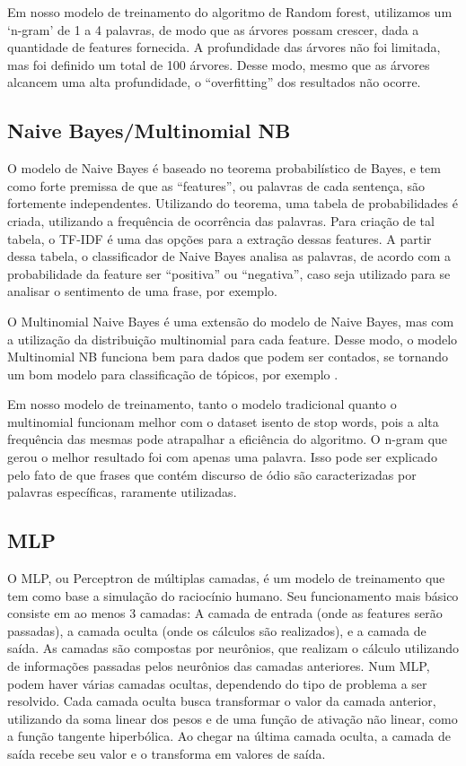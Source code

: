 Em nosso modelo de treinamento do algoritmo de Random forest, utilizamos um ‘n-gram’ de 1 a 4 palavras, de modo que as árvores possam crescer, dada a quantidade de features fornecida. A profundidade das árvores não foi limitada, mas foi definido um total de 100 árvores. Desse modo, mesmo que as árvores alcancem uma alta profundidade, o “overfitting” dos resultados não ocorre.

\subsection{Naive Bayes/Multinomial NB}
O modelo de Naive Bayes é baseado no teorema probabilístico de Bayes, e tem como forte premissa de que as “features”, ou palavras de cada sentença, são fortemente independentes. Utilizando do teorema, uma tabela de probabilidades é criada, utilizando a frequência de ocorrência das palavras. Para criação de tal tabela, o TF-IDF é uma das opções para a extração dessas features. A partir dessa tabela, o classificador de Naive Bayes analisa as palavras, de acordo com a probabilidade da feature ser “positiva” ou “negativa”, caso seja utilizado para se analisar o sentimento de uma frase, por exemplo.

O Multinomial Naive Bayes é uma extensão do modelo de Naive Bayes, mas com a utilização da distribuição multinomial para cada feature. Desse modo, o modelo Multinomial NB funciona bem para dados que podem ser contados, se tornando um bom modelo para classificação de tópicos, por exemplo \cite{russel-ia}.

Em nosso modelo de treinamento, tanto o modelo tradicional quanto o multinomial funcionam melhor com o dataset isento de stop words, pois a alta frequência das mesmas pode atrapalhar a eficiência do algoritmo. O n-gram que gerou o melhor resultado foi com apenas uma palavra. Isso pode ser explicado pelo fato de que frases que contém discurso de ódio são caracterizadas por palavras específicas, raramente utilizadas.

\subsection{MLP}

O MLP, ou Perceptron de múltiplas camadas, é um modelo de treinamento que tem como base a simulação do raciocínio humano. Seu funcionamento mais básico consiste em ao menos 3 camadas: A camada de entrada (onde as features serão passadas), a camada oculta (onde os cálculos são realizados), e a camada de saída. As camadas são compostas por neurônios, que realizam o cálculo utilizando de informações passadas pelos neurônios das camadas anteriores. Num MLP, podem haver várias camadas ocultas, dependendo do tipo de problema a ser resolvido. Cada camada oculta busca transformar o valor da camada anterior, utilizando da soma linear dos pesos e de uma função de ativação não linear, como a função tangente hiperbólica. Ao chegar na última camada oculta, a camada de saída recebe seu valor e o transforma em valores de saída.

